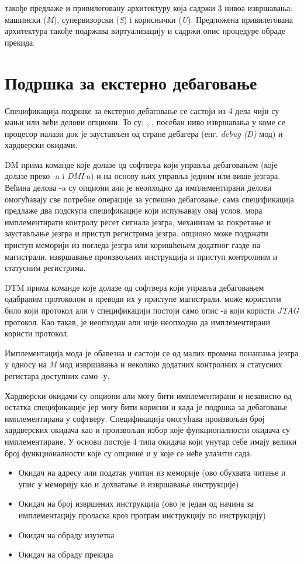  такође предлаже и привилеговану архитектуру\cite{priv_spec} која садржи 3 нивоа извршавања: машински (\textit{M}), супервизорски (\textit{S}) i кориснички (\textit{U}).
Предложена привилегована архитектура такође подржава виртуализацију и садржи опис процедуре обраде прекида.

\section{Подршка за екстерно дебаговање}

Спецификација подршке за екстерно дебаговање\cite{debug_spec} се састоји из 4 дела чији су мањи или већи делови опциони.
То су: , , посебан ниво извршавања у коме се процесор налази док је заустављен од стране дебагера (енг. \textit{debug (D)} мод) и хардверски окидачи.

\acrfull{DM} прима команде које долазе од софтвера који управља дебаговањем (које долазе преко -a i \textit{\acrfull{DMI}}-a) и на основу њих управља једним или више језгара.
Већина делова -a су опциони али је неопходно да имплементирани делови омогућавају све потребне операције за успешно дебаговање, сама спецификација предлаже два подскупа спецификације који испуњавају овај услов.
 мора имплементирати контролу ресет сигнала језгра, механизам за покретање и заустављање језгра и приступ регистрима језгра.
 опционо може подржати приступ меморији из погледа језгра или коришћењем додатног газде на магистрали, извршавање произвољних инструкција и приступ контролним и статусним регистрима.

\acrfull{DTM} прима команде које долазе од софтвера који управља дебаговањем одабраним протоколом и преводи их у приступе  магистрали.
 може користити било који протокол али у спецификацији постоји само опис -а који користи \textit{\acrfull{JTAG}} протокол.
Као такав,  је неопходан али није неопходно да имплементирани  користи  протокол.

Имплементација  мода је обавезна и састоји се од малих промена понашања језгра у односу на \textit{M} мод извршавања и неколико додатних контролних и статусних регистара доступних само -у.

Хардверски окидачи су опциони али могу бити имплементирани и независно од остатка спецификације јер могу бити корисни и када је подршка за дебаговање имплементирана у софтверу.
Спецификација омогућава произвољан број хардверских окидача као и произвољан избор које функционалности окидача су имплементиране.
У основи постоје 4 типа окидача који унутар себе имају велики број функционалности које су опционе и у које се неће улазити сада.
\begin{itemize}
	\item Окидач на адресу или податак учитан из меморије (ово обухвата читање и упис у меморију као и дохватање и извршавање инструкције)
	\item Окидач на број извршених инструкција (ово је један од начина за имплементацију проласка кроз програм инструкцију по инструкцију)
	\item Окидач на обраду изузетка
	\item Окидач на обраду прекида
\end{itemize}

